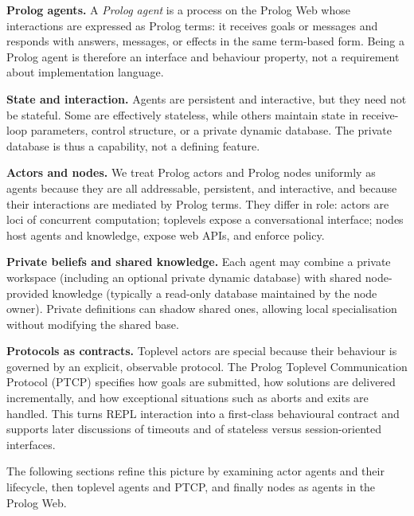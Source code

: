 \medskip
\noindent\textbf{Prolog agents.}
A \emph{Prolog agent} is a process on the Prolog Web whose interactions are expressed as Prolog terms: it receives goals or messages and responds with answers, messages, or effects in the same term-based form. Being a Prolog agent is therefore an interface and behaviour property, not a requirement about implementation language.

\medskip
\noindent\textbf{State and interaction.}
Agents are persistent and interactive, but they need not be stateful. Some are effectively stateless, while others maintain state in receive-loop parameters, control structure, or a private dynamic database. The private database is thus a capability, not a defining feature.

\medskip
\noindent\textbf{Actors and nodes.}
We treat Prolog actors and Prolog nodes uniformly as agents because they are all addressable, persistent, and interactive, and because their interactions are mediated by Prolog terms. They differ in role: actors are loci of concurrent computation; toplevels expose a conversational interface; nodes host agents and knowledge, expose web APIs, and enforce policy.

\medskip
\noindent\textbf{Private beliefs and shared knowledge.}
Each agent may combine a private workspace (including an optional private dynamic database) with shared node-provided knowledge (typically a read-only database maintained by the node owner). Private definitions can shadow shared ones, allowing local specialisation without modifying the shared base.

\medskip
\noindent\textbf{Protocols as contracts.}
Toplevel actors are special because their behaviour is governed by an explicit, observable protocol. The Prolog Toplevel Communication Protocol (PTCP) specifies how goals are submitted, how solutions are delivered incrementally, and how exceptional situations such as aborts and exits are handled. This turns REPL interaction into a first-class behavioural contract and supports later discussions of timeouts and of stateless versus session-oriented interfaces.

\medskip
\noindent The following sections refine this picture by examining actor agents and their lifecycle, then toplevel agents and PTCP, and finally nodes as agents in the Prolog Web.

